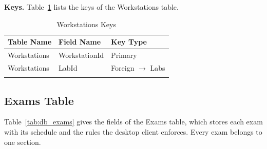 \par\ifdim\dimexpr\pagegoal-\pagetotal\relax<160pt\newpage\fi
\noindent\textbf{Keys.} Table~\ref{tab:keys_workstations} lists the keys of the Workstations table.

{\small
\begin{longtable}{>{\raggedright\arraybackslash}p{4.0cm}>{\raggedright\arraybackslash}p{4.6cm}>{\raggedright\arraybackslash}p{4.6cm}}
\caption{Workstations Keys}\label{tab:keys_workstations}\\
\hline\hline
\textbf{Table Name} & \textbf{Field Name} & \textbf{Key Type} \\ \hline
\endfirsthead
\hline\hline
\endlastfoot
Workstations & WorkstationId & Primary \\*
Workstations & LabId & Foreign $\rightarrow$ Labs \\*
\end{longtable}
}

\par\ifdim\dimexpr\pagegoal-\pagetotal\relax<376pt\newpage\fi
\subsection{Exams Table}
Table~\ref{tab:db_exams} gives the fields of the Exams table, which stores each exam with its schedule and the rules the desktop client enforces. Every exam belongs to one section.


